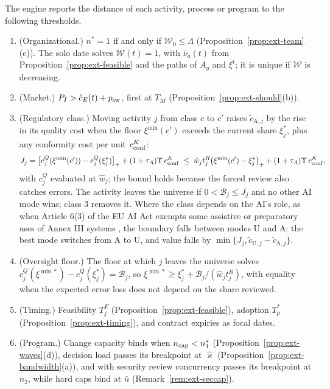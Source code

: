 \begin{proposition}\label{prop:ext-breaks}
The engine reports the distance of each activity, process or program to the following thresholds.
\begin{enumerate}
\item[(a)] (Organizational.) $n^*=1$ if and only if $\mathcal W_0\le\Lambda$ (Proposition~\ref{prop:ext-team}(c)). The solo date solves $\mathcal W(t)=1$, with $\bar\nu_a(t)$ from Proposition~\ref{prop:ext-feasible} and the paths of $A_g$ and $\xi^t$; it is unique if $\mathcal W$ is decreasing.
\item[(b)] (Market.) $P_I>\hat c_E(t)+p_{\rm sw}$, first at $T_M$ (Proposition~\ref{prop:ext-should}(b)).
\item[(c)] (Regulatory class.) Moving activity $j$ from class $c$ to $c'$ raises $\tilde c_{\mathrm A,j}$ by the rise in its quality cost when the floor $\xi^{\min}(c')$ exceeds the current share $\xi^*_j$, plus any conformity cost per unit $c^K_{\rm conf}$:
\[
J_j=\bigl[c^Q_j(\xi^{\min}(c'))-c^Q_j(\xi^*_j)\bigr]_++(1+\tau_A)\Upsilon\,c^K_{\rm conf}\;\le\;\hat w_jt^R_j\bigl(\xi^{\min}(c')-\xi^*_j\bigr)_++(1+\tau_A)\Upsilon\,c^K_{\rm conf},
\]
with $c^Q_j$ evaluated at $\hat w_j$; the bound holds because the forced review also catches errors. The activity leaves the universe if $0<\mathcal B_j\le J_j$ and no other AI mode wins; class 3 removes it. Where the class depends on the AI's role, as when Article 6(3) of the EU AI Act exempts some assistive or preparatory uses of Annex III systems \citep{eu2024regulation}, the boundary falls between modes U and A: the best mode switches from A to U, and value falls by $\min\{J_j,\tilde c_{\mathrm U,j}-\tilde c_{\mathrm A,j}\}$.
\item[(d)] (Oversight floor.) The floor at which $j$ leaves the universe solves $c^Q_j(\xi^{\min*})-c^Q_j(\xi^*_j)=\mathcal B_j$, so $\xi^{\min*}\ge\xi^*_j+\mathcal B_j/(\hat w_jt^R_j)$, with equality when the expected error loss does not depend on the share reviewed.
\item[(e)] (Timing.) Feasibility $T^F_j$ (Proposition~\ref{prop:ext-feasible}), adoption $T^*_p$ (Proposition~\ref{prop:ext-timing}), and contract expiries as focal dates.
\item[(f)] (Program.) Change capacity binds when $n_{\rm cap}<n_1^*$ (Proposition~\ref{prop:ext-waves}(d)), decision load passes its breakpoint at $\hat\varkappa$ (Proposition~\ref{prop:ext-bandwidth}(a)), and with security review concurrency passes its breakpoint at $\hat n_2$, while hard caps bind at $\bar n$ (Remark~\ref{rem:ext-seccap}).

\end{enumerate}
\end{proposition}
